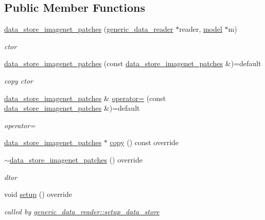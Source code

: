 \subsection*{Public Member Functions}
\begin{DoxyCompactItemize}
\item 
\hyperlink{classlbann_1_1data__store__imagenet__patches_ac98e8ba382516df619d24e67881df1eb}{data\+\_\+store\+\_\+imagenet\+\_\+patches} (\hyperlink{classlbann_1_1generic__data__reader}{generic\+\_\+data\+\_\+reader} $\ast$reader, \hyperlink{classlbann_1_1model}{model} $\ast$m)
\begin{DoxyCompactList}\small\item\em ctor \end{DoxyCompactList}\item 
\hyperlink{classlbann_1_1data__store__imagenet__patches_abaeae23e871e45836f5757fb50c25114}{data\+\_\+store\+\_\+imagenet\+\_\+patches} (const \hyperlink{classlbann_1_1data__store__imagenet__patches}{data\+\_\+store\+\_\+imagenet\+\_\+patches} \&)=default
\begin{DoxyCompactList}\small\item\em copy ctor \end{DoxyCompactList}\item 
\hyperlink{classlbann_1_1data__store__imagenet__patches}{data\+\_\+store\+\_\+imagenet\+\_\+patches} \& \hyperlink{classlbann_1_1data__store__imagenet__patches_a0a2e0ecbd10a65b02019ce9e816f88dd}{operator=} (const \hyperlink{classlbann_1_1data__store__imagenet__patches}{data\+\_\+store\+\_\+imagenet\+\_\+patches} \&)=default
\begin{DoxyCompactList}\small\item\em operator= \end{DoxyCompactList}\item 
\hyperlink{classlbann_1_1data__store__imagenet__patches}{data\+\_\+store\+\_\+imagenet\+\_\+patches} $\ast$ \hyperlink{classlbann_1_1data__store__imagenet__patches_a5067e8299f5cf073497a5005ee9db759}{copy} () const override
\item 
\hyperlink{classlbann_1_1data__store__imagenet__patches_ac4b8e5f893a4eccdeceee9c872a4b5b9}{$\sim$data\+\_\+store\+\_\+imagenet\+\_\+patches} () override
\begin{DoxyCompactList}\small\item\em dtor \end{DoxyCompactList}\item 
void \hyperlink{classlbann_1_1data__store__imagenet__patches_aa8cfaf12c87f3dbbbb4fc808f6ca26ad}{setup} () override
\begin{DoxyCompactList}\small\item\em called by \hyperlink{classlbann_1_1generic__data__reader_a8b2a09d38512fc11f1b9d572c89100a7}{generic\+\_\+data\+\_\+reader\+::setup\+\_\+data\+\_\+store} \end{DoxyCompactList}\end{DoxyCompactItemize}
